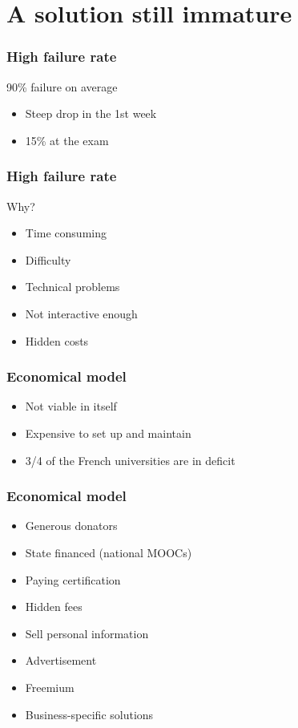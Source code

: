
\section{A solution still immature}
\setcounter{subsection}{1}

\begin{frame}
\frametitle{High failure rate}
  90\% failure on average
  \begin{itemize}[<+->]
    \item Steep drop in the 1st week
    \item 15\% at the exam
  \end{itemize}
\end{frame}

\begin{frame}
\frametitle{High failure rate}
  Why?
  \begin{itemize}[<+->]
    \item Time consuming
    \item Difficulty
    \item Technical problems
    \item Not interactive enough
    \item Hidden costs
  \end{itemize}
\end{frame}

\begin{frame}
\frametitle{Economical model}
  \begin{itemize}[<+->]
    \item Not viable in itself
    \item Expensive to set up and maintain
    \item 3/4 of the French universities are in deficit
  \end{itemize}
\end{frame}

\begin{frame}
\frametitle{Economical model}
  \begin{itemize}[<+->]
    \item Generous donators
    \item State financed (national MOOCs)
    \item Paying certification
    \item Hidden fees
    \item Sell personal information
    \item Advertisement
    \item Freemium
    \item Business-specific solutions
  \end{itemize}
\end{frame}

